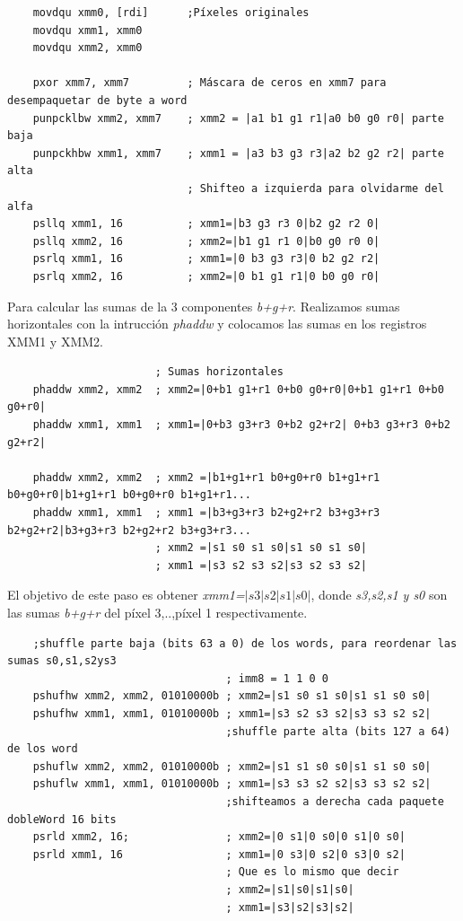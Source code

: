 \begin{codesnippet}
\begin{verbatim}
    movdqu xmm0, [rdi]      ;Píxeles originales
    movdqu xmm1, xmm0       
    movdqu xmm2, xmm0

    pxor xmm7, xmm7         ; Máscara de ceros en xmm7 para desempaquetar de byte a word
    punpcklbw xmm2, xmm7    ; xmm2 = |a1 b1 g1 r1|a0 b0 g0 r0| parte baja
    punpckhbw xmm1, xmm7    ; xmm1 = |a3 b3 g3 r3|a2 b2 g2 r2| parte alta
                            ; Shifteo a izquierda para olvidarme del alfa
    psllq xmm1, 16          ; xmm1=|b3 g3 r3 0|b2 g2 r2 0|
    psllq xmm2, 16          ; xmm2=|b1 g1 r1 0|b0 g0 r0 0|
    psrlq xmm1, 16          ; xmm1=|0 b3 g3 r3|0 b2 g2 r2|
    psrlq xmm2, 16          ; xmm2=|0 b1 g1 r1|0 b0 g0 r0|
\end{verbatim}
\end{codesnippet}

Para calcular las sumas de la 3 componentes \emph{b+g+r}. Realizamos sumas horizontales con la intrucción \emph{phaddw} y colocamos las sumas en los registros XMM1 y XMM2.

\begin{codesnippet}
\begin{verbatim}
                       ; Sumas horizontales
    phaddw xmm2, xmm2  ; xmm2=|0+b1 g1+r1 0+b0 g0+r0|0+b1 g1+r1 0+b0 g0+r0|
    phaddw xmm1, xmm1  ; xmm1=|0+b3 g3+r3 0+b2 g2+r2| 0+b3 g3+r3 0+b2 g2+r2|

    phaddw xmm2, xmm2  ; xmm2 =|b1+g1+r1 b0+g0+r0 b1+g1+r1 b0+g0+r0|b1+g1+r1 b0+g0+r0 b1+g1+r1...
    phaddw xmm1, xmm1  ; xmm1 =|b3+g3+r3 b2+g2+r2 b3+g3+r3 b2+g2+r2|b3+g3+r3 b2+g2+r2 b3+g3+r3...
                       ; xmm2 =|s1 s0 s1 s0|s1 s0 s1 s0|
                       ; xmm1 =|s3 s2 s3 s2|s3 s2 s3 s2|
\end{verbatim}
\end{codesnippet}

El objetivo de este paso es obtener \emph{xmm1=$|s3|s2|s1|s0|$}, donde \emph{s3,s2,s1 y s0} son las sumas \emph{b+g+r} del píxel 3,..,píxel 1 respectivamente.

\begin{codesnippet}
\begin{verbatim}
    ;shuffle parte baja (bits 63 a 0) de los words, para reordenar las sumas s0,s1,s2ys3
                                  ; imm8 = 1 1 0 0
    pshufhw xmm2, xmm2, 01010000b ; xmm2=|s1 s0 s1 s0|s1 s1 s0 s0| 
    pshufhw xmm1, xmm1, 01010000b ; xmm1=|s3 s2 s3 s2|s3 s3 s2 s2|
                                  ;shuffle parte alta (bits 127 a 64) de los word
    pshuflw xmm2, xmm2, 01010000b ; xmm2=|s1 s1 s0 s0|s1 s1 s0 s0|
    pshuflw xmm1, xmm1, 01010000b ; xmm1=|s3 s3 s2 s2|s3 s3 s2 s2|
                                  ;shifteamos a derecha cada paquete dobleWord 16 bits
    psrld xmm2, 16;               ; xmm2=|0 s1|0 s0|0 s1|0 s0| 
    psrld xmm1, 16                ; xmm1=|0 s3|0 s2|0 s3|0 s2| 
								  ; Que es lo mismo que decir
                                  ; xmm2=|s1|s0|s1|s0|
                                  ; xmm1=|s3|s2|s3|s2|
\end{verbatim}
\end{codesnippet}

